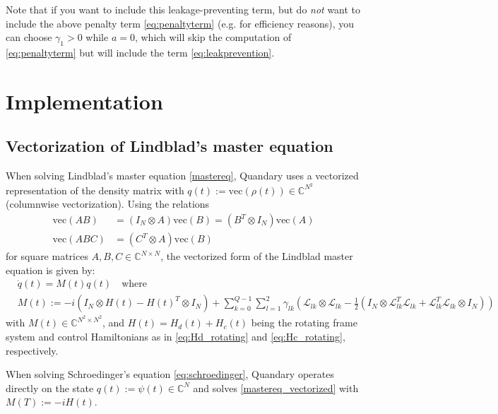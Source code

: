 \documentclass[11pt]{article}
\newcommand{\Ell}{\mathcal{L}}
\newcommand{\C}{\mathds{C}}
\begin{document}
Note that if you want to include this leakage-preventing term, but do \textit{not} want to include the above penalty term \eqref{eq:penaltyterm} (e.g. for efficiency reasons), you can choose $\gamma_1>0$ while $a=0$, which will skip the computation of \eqref{eq:penaltyterm} but will include the term \eqref{eq:leakprevention}. 




\section{Implementation}

  \subsection{Vectorization of Lindblad's master equation}
  When solving Lindblad's master equation \eqref{mastereq}, Quandary uses a vectorized representation of the density matrix with $q(t) := \text{vec}(\rho(t)) \in \C^{N^2}$ (columnwise vectorization). Using the
  relations
  \begin{align}
   \text{vec}(AB) &= (I_N\otimes A)\text{vec}(B) = (B^T\otimes I_N)\text{vec}(A)
    \\
   \text{vec}(ABC) &= (C^T\otimes A)\text{vec}(B)
  \end{align}
  for square matrices $A,B,C\in\C^{N\times N}$, the vectorized
  form of the Lindblad master equation is given by:
  \begin{align}\label{mastereq_vectorized}
    &\dot q(t) = M(t) q(t) \quad  \text{where} \\
    &M(t) := -i(I_N\otimes H(t) - H(t)^T \otimes I_N) + \sum_{k=0}^{Q-1}\sum_{l=1}^2 \gamma_{lk}
    \left( \Ell_{lk}\otimes \Ell_{lk} - \frac 1 2 \left( I_N\otimes
    \Ell^T_{lk}\Ell_{lk} + \Ell^T_{lk}\Ell_{lk} \otimes I_N \right) \right)
  \end{align}
   with $M(t) \in \C^{N^2\times N^2}$, and $H(t) = H_d(t) + H_c(t)$ being the rotating frame system and control Hamiltonians as in \eqref{eq:Hd_rotating} and \eqref{eq:Hc_rotating}, respectively.

   When solving Schroedinger's equation \eqref{eq:schroedinger}, Quandary operates directly on the state $q(t) := \psi(t)\in\C^N$ and solves \eqref{mastereq_vectorized} with $M(T) := -iH(t)$.
    
\end{document}
